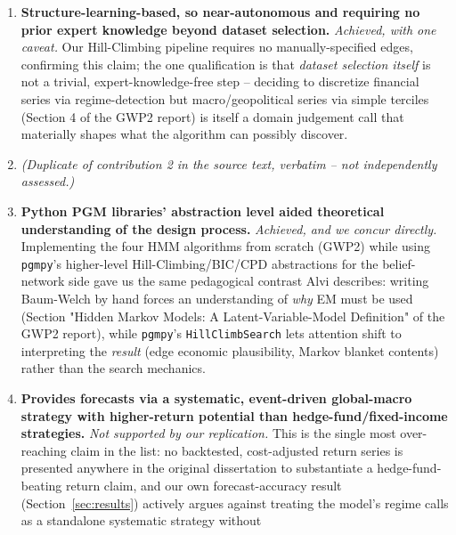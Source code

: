 \begin{enumerate}
    naive-persistence baseline -- directly contradicts "deployable"; a
    mechanism that underperforms the trivial baseline cannot be handed
    an independent capital-allocation mandate without a human overseeing
    it. This matters because it is exactly the kind of overclaim a risk
    manager must be trained to catch before signing off on a model.
  \item \textbf{Structure-learning-based, so near-autonomous and
    requiring no prior expert knowledge beyond dataset selection.}
    \emph{Achieved, with one caveat.} Our Hill-Climbing pipeline requires
    no manually-specified edges, confirming this claim; the one
    qualification is that \emph{dataset selection itself} is not a
    trivial, expert-knowledge-free step -- deciding to discretize
    financial series via regime-detection but macro/geopolitical series
    via simple terciles (Section 4 of the GWP2 report) is itself a
    domain judgement call that materially shapes what the algorithm can
    possibly discover.
  \item \textit{(Duplicate of contribution 2 in the source text,
    verbatim -- not independently assessed.)}
  \item \textbf{Python PGM libraries' abstraction level aided theoretical
    understanding of the design process.} \emph{Achieved, and we concur
    directly.} Implementing the four HMM algorithms from scratch (GWP2)
    while using \texttt{pgmpy}'s higher-level Hill-Climbing/BIC/CPD
    abstractions for the belief-network side gave us the same
    pedagogical contrast Alvi describes: writing Baum-Welch by hand
    forces an understanding of \emph{why} EM must be used (Section
    "Hidden Markov Models: A Latent-Variable-Model Definition" of the
    GWP2 report), while \texttt{pgmpy}'s \texttt{HillClimbSearch} lets
    attention shift to interpreting the \emph{result} (edge economic
    plausibility, Markov blanket contents) rather than the search
    mechanics.
  \item \textbf{Provides forecasts via a systematic, event-driven
    global-macro strategy with higher-return potential than
    hedge-fund/fixed-income strategies.} \emph{Not supported by our
    replication.} This is the single most over-reaching claim in the
    list: no backtested, cost-adjusted return series is presented
    anywhere in the original dissertation to substantiate a
    hedge-fund-beating return claim, and our own forecast-accuracy
    result (Section~\ref{sec:results}) actively argues against treating
    the model's regime calls as a standalone systematic strategy without

\end{enumerate}
